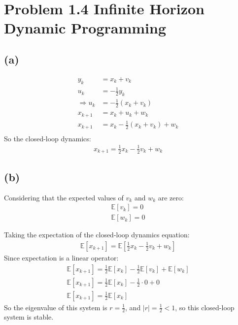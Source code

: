 \documentclass[8pt, a4paper, oneside, justified]{article}
\numberwithin{equation}{section}
\begin{document}
\newpage

\section*{Problem 1.4 Infinite Horizon Dynamic Programming}
\setcounter{equation}{0} %

\subsection*{(a)}

\begin{align}
    y_k & = x_k+v_k \\
    u_k & = -\frac{1}{2}y_k \\
    \Rightarrow u_k & = -\frac{1}{2}(x_k + v_k) \\
    x_{k+1} & =x_k + u_k + w_k \\
    x_{k+1} & =x_k -\frac{1}{2}(x_k + v_k) + w_k \\
\end{align}
So the closed-loop dynamics:
\begin{align}
    x_{k+1} = \frac{1}{2}x_k - \frac{1}{2}v_k + w_k
\end{align}

\subsection*{(b)}

Considering that the expected values of $v_k$ and $w_k$ are zero:
\begin{align}
    \mathbb{E}[v_k] = 0 \\
    \mathbb{E}[w_k] = 0
\end{align}

Taking the expectation of the closed-loop dynamics equation:
\begin{align}
    \mathbb{E}[x_{k+1}] = \mathbb{E}[\frac{1}{2}x_k - \frac{1}{2}v_k + w_k]
\end{align}
Since expectation is a linear operator:
\begin{align}
    \mathbb{E}[x_{k+1}] = \frac{1}{2}\mathbb{E}[x_k] - \frac{1}{2}\mathbb{E}[v_k] + \mathbb{E}[w_k] \\
    \mathbb{E}[x_{k+1}] = \frac{1}{2}\mathbb{E}[x_k] - \frac{1}{2}\cdot 0 + 0 \\
    \mathbb{E}[x_{k+1}] = \frac{1}{2}\mathbb{E}[x_k]
\end{align}
So the eigenvalue of this system is $r = \frac{1}{2}$, and $|r| = \frac{1}{2} < 1$, 
so this closed-loop system is stable.
\end{document}

